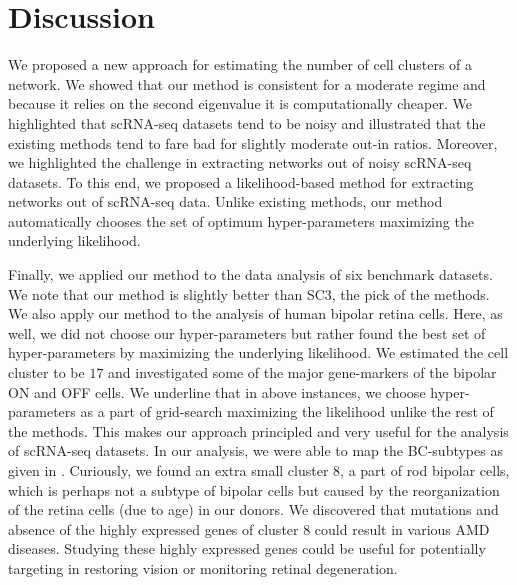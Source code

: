 \documentclass[11pt]{article}
\begin{document}
\section{Discussion}\label{discussion}
We proposed a new approach for estimating the number of cell clusters of a network. We showed that our method is consistent for a moderate regime and because it relies on the second eigenvalue it is computationally cheaper. We highlighted that scRNA-seq datasets tend to be noisy and illustrated that the existing methods tend to fare bad for slightly moderate out-in ratios. Moreover, we highlighted the challenge in extracting networks out of noisy scRNA-seq datasets. To this end, we proposed a likelihood-based method for extracting networks out of scRNA-seq data. Unlike existing methods, our method automatically chooses the set of optimum hyper-parameters maximizing the underlying likelihood.

Finally, we applied our method to the data analysis of six benchmark datasets. We note that our method is slightly better than SC3, the pick of the methods. We also apply our method to the analysis of human bipolar retina cells. Here, as well, we did not choose our hyper-parameters but rather found the best set of hyper-parameters by maximizing the underlying likelihood. We estimated the cell cluster to be $17$ and investigated some of the major gene-markers of the bipolar ON and OFF cells. We underline that in above instances, we choose hyper-parameters as a part of grid-search maximizing the likelihood unlike the rest of the methods. This makes our approach principled and very useful for the analysis of scRNA-seq datasets.
In our analysis, we were able to map the BC-subtypes as given in \cite{shekhar2016}. Curiously, we found an extra small cluster $8$, a part of rod bipolar cells, which is perhaps not a subtype of bipolar cells but caused by the reorganization of the retina cells (due to age) in our donors. We discovered that mutations and absence of the highly expressed genes of cluster $8$ could result in various AMD diseases. Studying these highly expressed genes could be useful for potentially targeting in restoring vision or monitoring retinal degeneration. 


\end{document}
